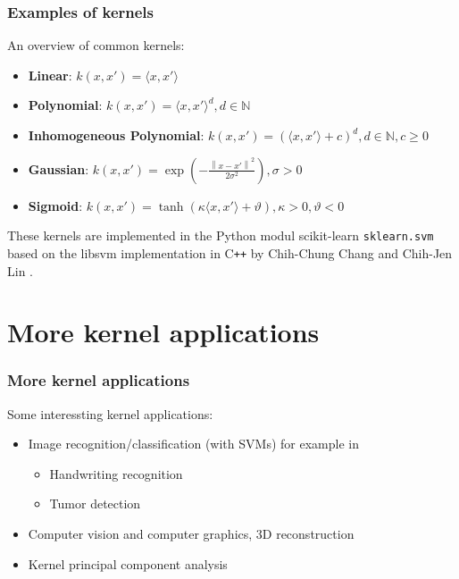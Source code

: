 \documentclass{beamer}
\begin{document}
\begin{frame}{}
	\frametitle{Examples of kernels}
    An overview of common kernels:
    \begin{itemize}
        \item \textbf{Linear}: $k(x,x') = \langle x, x' \rangle$
        \item \textbf{Polynomial}: $k(x,x') = \langle x, x' \rangle^{d}, d \in \mathbb{N}$
        \item \textbf{Inhomogeneous Polynomial}: $k(x,x') = \left( \langle x, x' \rangle + c \right)^{d}, d \in \mathbb{N}, c \geq 0$
        \item \textbf{Gaussian}: $k(x, x') = \exp \left( - \frac{\left\lVert x - x' \right\rVert^2}{2 \sigma^2} \right), \sigma > 0$
        \item \textbf{Sigmoid}: $k(x, x') = \tanh \left( \kappa \langle x, x' \rangle + \vartheta \right), \kappa > 0, \vartheta < 0$
    \end{itemize}
    \bigskip
    These kernels are implemented in the Python modul scikit-learn \texttt{sklearn.svm} based on the libsvm implementation in C\texttt{++} by Chih-Chung Chang and Chih-Jen Lin \cite{libsvm}.
\end{frame}




\section{More kernel applications}

\begin{frame}{}
	\frametitle{More kernel applications}
    Some interessting kernel applications:
    \begin{itemize}
        \item Image recognition/classification (with SVMs) for example in 
            \begin{itemize}
                \item Handwriting recognition
                \item Tumor detection
            \end{itemize}
        \item Computer vision and computer graphics, 3D reconstruction
        \item Kernel principal component analysis
    \end{itemize}
\end{frame}
\end{document}
